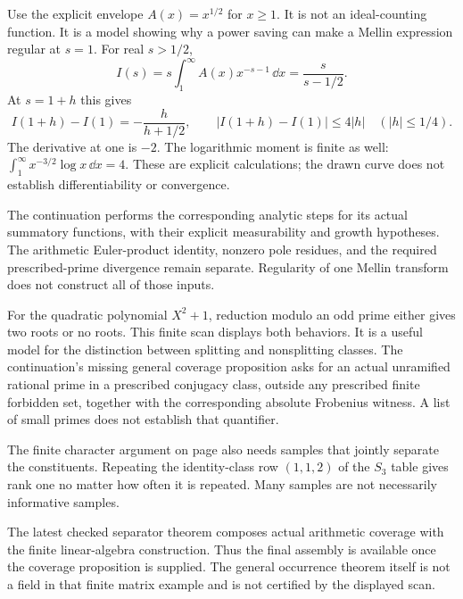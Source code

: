 Use the explicit envelope $A(x)=x^{1/2}$ for $x\ge1$. It is not an ideal-counting function. It is a model showing why a power saving can make a Mellin expression regular at $s=1$.
For real $s>1/2$,
\[
I(s)=s\int_1^\infty A(x)x^{-s-1}\,\dd x
=\frac{s}{s-1/2}.
\]
At $s=1+h$ this gives
\[
I(1+h)-I(1)=-\frac{h}{h+1/2},
\qquad |I(1+h)-I(1)|\le4|h|
\quad (|h|\le1/4).
\]
The derivative at one is $-2$. The logarithmic moment is finite as well: $\int_1^\infty x^{-3/2}\log x\,\dd x=4$. These are explicit calculations; the drawn curve does not establish differentiability or convergence.

The continuation performs the corresponding analytic steps for its actual summatory functions, with their explicit measurability and growth hypotheses. The arithmetic Euler-product identity, nonzero pole residues, and the required prescribed-prime divergence remain separate. Regularity of one Mellin transform does not construct all of those inputs.

For the quadratic polynomial $X^2+1$, reduction modulo an odd prime either gives two roots or no roots. This finite scan displays both behaviors. It is a useful model for the distinction between splitting and nonsplitting classes.
The continuation's missing general coverage proposition asks for an actual unramified rational prime in a prescribed conjugacy class, outside any prescribed finite forbidden set, together with the corresponding absolute Frobenius witness. A list of small primes does not establish that quantifier.

The finite character argument on page  also needs samples that jointly separate the constituents. Repeating the identity-class row $(1,1,2)$ of the $S_3$ table gives rank one no matter how often it is repeated. Many samples are not necessarily informative samples.

The latest checked separator theorem composes actual arithmetic coverage with the finite linear-algebra construction. Thus the final assembly is available once the coverage proposition is supplied. The general occurrence theorem itself is not a field in that finite matrix example and is not certified by the displayed scan.

